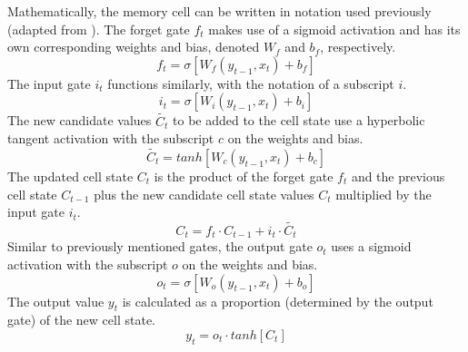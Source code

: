 Mathematically, the memory cell can be written in notation used previously (adapted from \cite{understandinglstm}). The forget gate $f_t$ makes use of a sigmoid activation and has its own corresponding weights and bias, denoted $W_f$ and $b_f$, respectively.
\begin{equation*}
    f_t = \sigma[W_f(y_{t-1}, x_t) + b_f] 
\end{equation*}
The input gate $i_t$ functions similarly, with the notation of a subscript $i$.
\begin{equation*}
    i_t = \sigma[W_i(y_{t-1}, x_t) + b_i] 
\end{equation*}
The new candidate values $\tilde{C_t}$ to be added to the cell state use a hyperbolic tangent activation with the subscript $c$ on the weights and bias.
\begin{equation*}
    \tilde{C_t} = tanh[W_c(y_{t-1}, x_t) + b_c]
\end{equation*}
The updated cell state $C_t$ is the product of the forget gate $f_t$ and the previous cell state $C_{t-1}$ plus the new candidate cell state values $C_{t}$ multiplied by the input gate $i_t$.
\begin{equation*}
    C_t = f_t\cdot C_{t-1} + i_t\cdot \tilde{C_t}
\end{equation*}
Similar to previously mentioned gates, the output gate $o_t$ uses a sigmoid activation with the subscript $o$ on the weights and bias.
\begin{equation*}
    o_t = \sigma[W_o(y_{t-1}, x_t) + b_o]
\end{equation*}
The output value $y_t$ is calculated as a proportion (determined by the output gate) of the new cell state.
\begin{equation*}
    y_t = o_t\cdot tanh[C_t]
\end{equation*}
